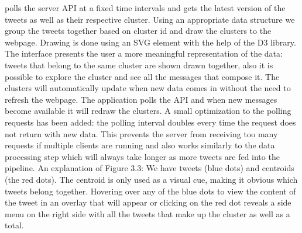 {\frontend}  polls the server API at a fixed time intervals and gets the latest version of the tweets as well as their respective cluster. Using an appropriate data structure we group the tweets together based on cluster id and draw the clusters to the webpage. Drawing is done using an SVG element with the help of the D3 library.
\newline
The interface presents the user a more meaningful representation of the data: tweets that belong to the same cluster are shown drawn together, also it is possible to explore the cluster and see all the messages that compose it.
\newline
The clusters will automatically update when new data comes in without the need to refresh the webpage. The application polls the API and when new messages become available it will redraw the clusters. A small optimization to the polling requests has been added: the polling interval doubles every time the request does not return with new data. This prevents the server from receiving too many requests if multiple {\frontend}  clients are running and also works similarly to the data processing step which will always take longer as more tweets are fed into the pipeline.
\newline
An explanation of Figure 3.3: We have tweets (blue dots) and centroids (the red dots). The centroid is only used as a visual cue, making it obvious which tweets belong together. Hovering over any of the blue dots to view the content of the tweet in an overlay that will appear or clicking on the red dot reveals a side menu on the right side with all the tweets that make up the cluster as well as a total.
